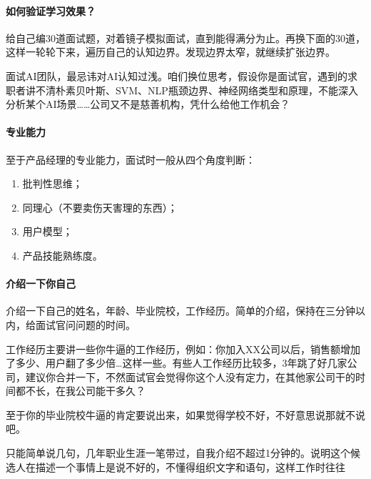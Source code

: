\documentclass[letterpaper,11pt,english]{sphinxmanual}
\begin{document}
\paragraph{如何验证学习效果？}
\label{\detokenize{chapter_interview/question:id2}}
给自己编30道面试题，对着镜子模拟面试，直到能得满分为止。再换下面的30道，这样一轮轮下来，遍历自己的认知边界。发现边界太窄，就继续扩张边界。

面试AI团队，最忌讳对AI认知过浅。咱们换位思考，假设你是面试官，遇到的求职者讲不清朴素贝叶斯、SVM、NLP瓶颈边界、神经网络类型和原理，不能深入分析某个AI场景……公司又不是慈善机构，凭什么给他工作机会？


\paragraph{专业能力}
\label{\detokenize{chapter_interview/question:id3}}
至于产品经理的专业能力，面试时一般从四个角度判断：
\begin{enumerate}
%
\item {} 
批判性思维；

\item {} 
同理心（不要卖伤天害理的东西）；

\item {} 
用户模型；

\item {} 
产品技能熟练度。

\end{enumerate}


\paragraph{介绍一下你自己}
\label{\detokenize{chapter_interview/question:id4}}
介绍一下自己的姓名，年龄、毕业院校，工作经历。简单的介绍，保持在三分钟以内，给面试官问问题的时间。

工作经历主要讲一些你牛逼的工作经历，例如：你加入XX公司以后，销售额增加了多少、用户翻了多少倍…这样一些。有些人工作经历比较多，3年跳了好几家公司，建议你合并一下，不然面试官会觉得你这个人没有定力，在其他家公司干的时间都不长，在我公司能干多久？

至于你的毕业院校牛逼的肯定要说出来，如果觉得学校不好，不好意思说那就不说吧。

只能简单说几句，几年职业生涯一笔带过，自我介绍不超过1分钟的。说明这个候选人在描述一个事情上是说不好的，不懂得组织文字和语句，这样工作时往往%
\begin{footnote}[791]\sphinxAtStartFootnote
{}
%
\end{footnote}
\end{document}
